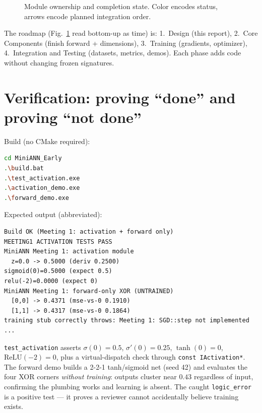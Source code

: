 \documentclass[11pt,a4paper]{article}
\begin{document}
\begin{figure}[h]
\centering
{}
\caption{Module ownership and completion state. Color encodes status, arrows encode planned integration order.}\label{fig:modules}
\end{figure}

The roadmap (Fig.~\ref{fig:modules} read bottom-up as time) is: 1.~Design (this report),
2.~Core Components (finish forward + dimensions), 3.~Training (gradients, optimizer),
4.~Integration and Testing (datasets, metrics, demos). Each phase adds code without changing
frozen signatures.

\section{Verification: proving ``done'' and proving ``not done''}
Build (no CMake required):
\begin{lstlisting}[language=bash]
cd MiniANN_Early
.\build.bat
.\test_activation.exe
.\activation_demo.exe
.\forward_demo.exe
\end{lstlisting}
Expected output (abbreviated):
\begin{lstlisting}
Build OK (Meeting 1: activation + forward only)
MEETING1 ACTIVATION TESTS PASS
MiniANN Meeting 1: activation module
  z=0.0 -> 0.5000 (deriv 0.2500)
sigmoid(0)=0.5000 (expect 0.5)
relu(-2)=0.0000 (expect 0)
MiniANN Meeting 1: forward-only XOR (UNTRAINED)
  [0,0] -> 0.4371 (mse-vs-0 0.1910)
  [1,1] -> 0.4317 (mse-vs-0 0.1864)
training stub correctly throws: Meeting 1: SGD::step not implemented ...
\end{lstlisting}
\texttt{test\_activation} asserts $\sigma(0)=0.5$, $\sigma'(0)=0.25$, $\tanh(0)=0$,
$\mathrm{ReLU}(-2)=0$, plus a virtual-dispatch check through \texttt{const IActivation*}. The
forward demo builds a 2-2-1 tanh/sigmoid net (seed 42) and evaluates the four XOR corners
\emph{without training}: outputs cluster near $0.43$ regardless of input, confirming the plumbing
works and learning is absent. The caught \texttt{logic\_error} is a positive test --- it proves a
reviewer cannot accidentally believe training exists.
\end{document}
